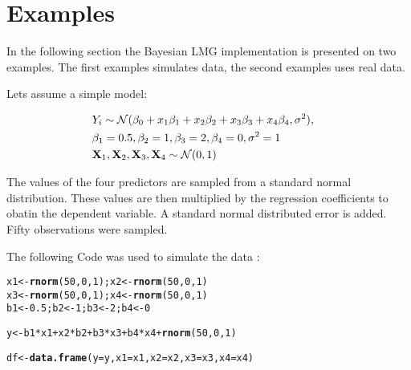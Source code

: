 \documentclass[11pt,a4paper,twoside]{book}
\makeatletter
\newcommand{\hlnum}[1]{\textcolor[rgb]{0.686,0.059,0.569}{#1}}%
\newcommand{\hlopt}[1]{\textcolor[rgb]{0,0,0}{#1}}%
\newcommand{\hlstd}[1]{\textcolor[rgb]{0.345,0.345,0.345}{#1}}%
\newcommand{\hlkwb}[1]{\textcolor[rgb]{0.69,0.353,0.396}{#1}}%
\newcommand{\hlkwc}[1]{\textcolor[rgb]{0.333,0.667,0.333}{#1}}%
\newcommand{\hlkwd}[1]{\textcolor[rgb]{0.737,0.353,0.396}{\textbf{#1}}}%
\newenvironment{kframe}{%
 \def\at@end@of@kframe{}%
 \ifinner\ifhmode%
  \def\at@end@of@kframe{\end{minipage}}%
  \begin{minipage}{\columnwidth}%
 \fi\fi%
 \def\FrameCommand##1{\hskip\@totalleftmargin \hskip-\fboxsep
 \colorbox{shadecolor}{##1}\hskip-\fboxsep
     \hskip-\linewidth \hskip-\@totalleftmargin \hskip\columnwidth}%
 \MakeFramed {\advance\hsize-\width
   \@totalleftmargin\z@ \linewidth\hsize
   \@setminipage}}%
 {\par\unskip\endMakeFramed%
 \at@end@of@kframe}
\newenvironment{knitrout}{}{} %
\makeatother
\begin{document}






\chapter{Examples}

In the following section the Bayesian LMG implementation is presented on two examples. The first examples simulates data, the second examples uses real data.

Lets assume a simple model: 

\begin{align} 
&Y_{i} \sim \mathcal{N}(\beta_{0}+x_{1} \beta_{1}+x_{2} \beta_{2}+x_{3} \beta_{3}+x_{4} \beta_{4}, \sigma^2),& \\ & \beta_{1} = 0.5, \beta_{2} = 1,  \beta_{3} = 2 , \beta_{4}=0, \sigma^2 = 1 & \\ & {\mathbf{X}}_{1}, {\mathbf{X}}_{2},{\mathbf{X}}_{3},{\mathbf{X}}_{4} \sim \mathcal{N}(0, 1)&
\end{align} 


The values of the four predictors are sampled from a standard normal distribution. These values are then multiplied by the regression coefficients to obatin the dependent variable. A standard normal distributed error is added. Fifty observations were sampled.

The following Code was used to simulate the data :

\begin{knitrout}
\color{fgcolor}\begin{kframe}
\begin{alltt}
\hlstd{x1} \hlkwb{<-} \hlkwd{rnorm}\hlstd{(}\hlnum{50}\hlstd{,} \hlnum{0}\hlstd{,} \hlnum{1}\hlstd{); x2} \hlkwb{<-} \hlkwd{rnorm}\hlstd{(}\hlnum{50}\hlstd{,} \hlnum{0}\hlstd{,} \hlnum{1}\hlstd{)}
\hlstd{x3} \hlkwb{<-} \hlkwd{rnorm}\hlstd{(}\hlnum{50}\hlstd{,} \hlnum{0}\hlstd{,} \hlnum{1}\hlstd{); x4} \hlkwb{<-} \hlkwd{rnorm}\hlstd{(}\hlnum{50}\hlstd{,} \hlnum{0}\hlstd{,} \hlnum{1}\hlstd{)}
\hlstd{b1} \hlkwb{<-} \hlnum{0.5}\hlstd{; b2} \hlkwb{<-} \hlnum{1}\hlstd{; b3} \hlkwb{<-} \hlnum{2}\hlstd{; b4} \hlkwb{<-} \hlnum{0}

\hlstd{y} \hlkwb{<-} \hlstd{b1}\hlopt{*}\hlstd{x1} \hlopt{+} \hlstd{x2}\hlopt{*}\hlstd{b2} \hlopt{+} \hlstd{b3}\hlopt{*}\hlstd{x3} \hlopt{+} \hlstd{b4}\hlopt{*}\hlstd{x4} \hlopt{+} \hlkwd{rnorm}\hlstd{(}\hlnum{50}\hlstd{,} \hlnum{0}\hlstd{,} \hlnum{1}\hlstd{)}

\hlstd{df} \hlkwb{<-} \hlkwd{data.frame}\hlstd{(}\hlkwc{y} \hlstd{= y,} \hlkwc{x1} \hlstd{= x1,} \hlkwc{x2} \hlstd{= x2,} \hlkwc{x3} \hlstd{= x3,} \hlkwc{x4} \hlstd{= x4)}
\end{alltt}
\end{kframe}
\end{knitrout}
\end{document}
